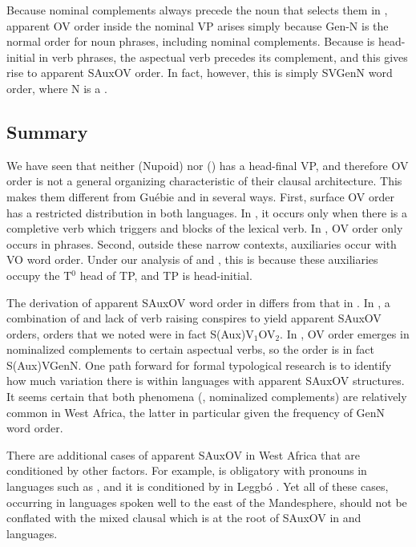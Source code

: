 \documentclass[output=paper,newtxmath,modfonts,nonflat,draftmode]{langsci/langscibook}
\begin{document}
Because nominal complements always precede the noun that selects them in  , apparent OV order inside the nominal VP arises simply because Gen-N is the normal order for noun phrases, including nominal complements. Because  is head-initial in verb phrases, the aspectual verb precedes its complement, and this gives rise to apparent SAuxOV order. In fact, however, this is simply SVGenN word order, where N is a .

\subsection{Summary}

We have seen that neither  (Nupoid) nor  () has a head-final VP, and therefore OV order is not a general organizing characteristic of their clausal architecture. This makes them different from Guébie and  in several ways. First, surface OV order has a restricted distribution in both languages. In , it occurs only when there is a completive verb which triggers  and blocks  of the lexical verb. In , OV order only occurs in  phrases. Second, outside these narrow contexts, auxiliaries occur with VO word order. Under our analysis of  and , this is because these auxiliaries occupy the T$^0$ head of TP, and TP is head-initial.

The derivation of apparent SAuxOV word order in  differs from that in . In , a combination of  and lack of verb raising conspires to yield apparent SAuxOV orders, orders that we noted were in fact S(Aux)V$_1$OV$_2$. In , OV order emerges in nominalized complements to certain aspectual verbs, so the  order is in fact S(Aux)VGenN. One path forward for formal typological research is to identify how much variation there is within languages with apparent SAuxOV structures. It seems certain that both phenomena (, nominalized complements) are relatively common in West Africa, the latter in particular given the frequency of GenN word order.

There are additional cases of apparent SAuxOV in West Africa that are conditioned by other factors. For example,  is obligatory with pronouns in  languages such as  \citep{ikoro96}, and it is conditioned by  in Leggbó \citep{good07}. Yet all of these cases, occurring in languages spoken well to the east of the Mandesphere, should not be conflated with the mixed clausal  which is at the root of SAuxOV in  and  languages.
\end{document}
